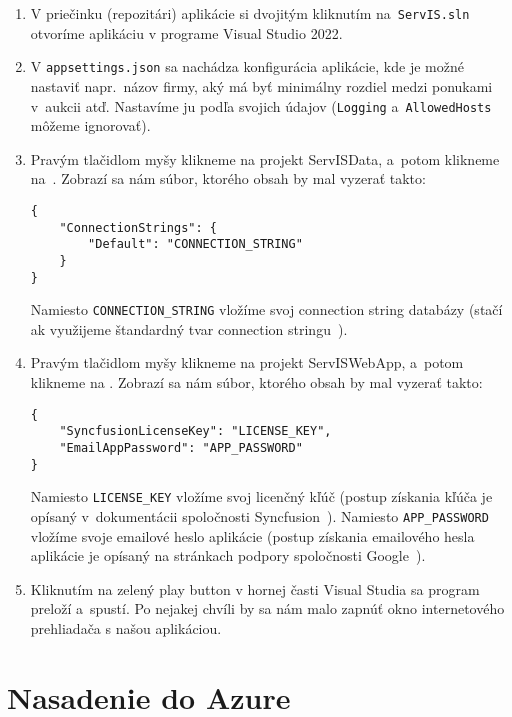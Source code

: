 \begin{enumerate}
  \item V priečinku (repozitári) aplikácie si dvojitým kliknutím na~\verb|ServIS.sln| otvoríme aplikáciu v programe Visual Studio 2022.
  \item V \verb|appsettings.json| sa nachádza konfigurácia aplikácie, kde je možné nastaviť napr.~názov firmy, aký má byť minimálny rozdiel medzi ponukami v~aukcii atď. Nastavíme ju podľa svojich údajov (\verb|Logging| a~\verb|AllowedHosts| môžeme ignorovať).
  \newpage
  \item Pravým tlačidlom myšy klikneme na projekt ServISData, a~potom klikneme na~. Zobrazí sa nám súbor, ktorého obsah by mal vyzerať takto:
  
\begin{verbatim}
{
    "ConnectionStrings": {
        "Default": "CONNECTION_STRING"
    }
}
\end{verbatim}  
  
Namiesto \verb|CONNECTION_STRING| vložíme svoj connection string databázy (stačí ak využijeme štandardný tvar connection stringu~\cite{standard connection string}).

  \item Pravým tlačidlom myšy klikneme na projekt ServISWebApp, a~potom klikneme na . Zobrazí sa nám súbor, ktorého obsah by mal vyzerať takto:
  
\begin{verbatim}
{
    "SyncfusionLicenseKey": "LICENSE_KEY",
    "EmailAppPassword": "APP_PASSWORD"
}
\end{verbatim}  
  
Namiesto \verb|LICENSE_KEY| vložíme svoj licenčný kľúč (postup získania kľúča je opísaný v~dokumentácii spoločnosti Syncfusion~\cite{license key}). Namiesto \verb|APP_PASSWORD| vložíme svoje emailové heslo aplikácie (postup získania emailového hesla aplikácie je opísaný na stránkach podpory spoločnosti Google~\cite{app password}).
  
  \item Kliknutím na zelený play button v hornej časti Visual Studia sa program preloží a~spustí. Po nejakej chvíli by sa nám malo zapnúť okno internetového prehliadača s našou aplikáciou.
\end{enumerate}

\section{Nasadenie do Azure}

